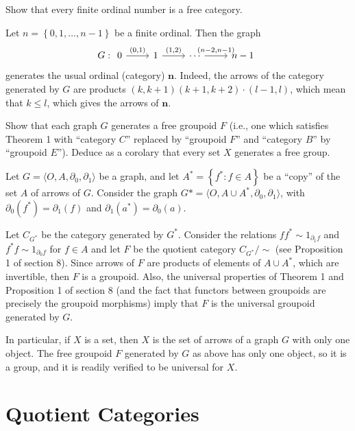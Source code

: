 \begin{exercise}
Show that every finite ordinal number is a free category.
\end{exercise}
\begin{solution}
Let $n=\left\{0,1,\ldots,n-1\right\}$ be a finite ordinal. Then the graph
\[G:\begin{tikzcd}
0\arrow[r,"(0\text{$,$}1)"]&1\arrow[r,"(1\text{$,$}2)"]&\cdots\arrow[r,"(n-2\text{$,$}n-1)"]&n-1
\end{tikzcd}\]
generates the usual ordinal (category) $\mathbf{n}$. Indeed, the arrows of the category generated by $G$ are products $(k,k+1)(k+1,k+2)\cdot(l-1,l)$, which mean that $k\leq l$, which gives the arrows of $\mathbf{n}$.
\end{solution}

\begin{exercise}
Show that each graph $G$ generates a free groupoid $F$ (i.e., one which satisfies Theorem 1 with ``category $C$'' replaced by ``groupoid $F$'' and ``category $B$'' by ``groupoid $E$''). Deduce as a corolary that every set $X$ generates a free group.
\end{exercise}
\begin{solution}
Let $G=\langle O,A,\partial_0,\partial_1\rangle$ be a graph, and let $A^*=\left\{f^*:f\in A\right\}$ be a ``copy'' of the set $A$ of arrows of $G$. Consider the graph $G*=\langle O,A\cup A^*,\partial_0,\partial_1\rangle$, with $\partial_0(f^*)=\partial_1(f)$ and $\partial_1(a^*)=\partial_0(a)$.

Let $C_{G^*}$ be the category generated by $G^*$. Consider the relations $ff^*\sim1_{\partial_1 f}$ and $f^*f \sim1_{\partial_0 f}$ for $f\in A$ and let $F$ be the quotient category $C_{G^*}/\sim$ (see Proposition 1 of section 8). Since arrows of $F$ are products of elements of $A\cup A^*$, which are invertible, then $F$ is a groupoid. Also, the universal properties of Theorem 1 and Proposition 1 of section 8 (and the fact that functors between groupoids are precisely the groupoid morphisms) imply that $F$ is the universal groupoid generated by $G$.

In particular, if $X$ is a set, then $X$ is the set of arrows of a graph $G$ with only one object. The free groupoid $F$ generated by $G$ as above has only one object, so it is a group, and it is readily verified to be universal for $X$.
\end{solution}

\section{Quotient Categories}

